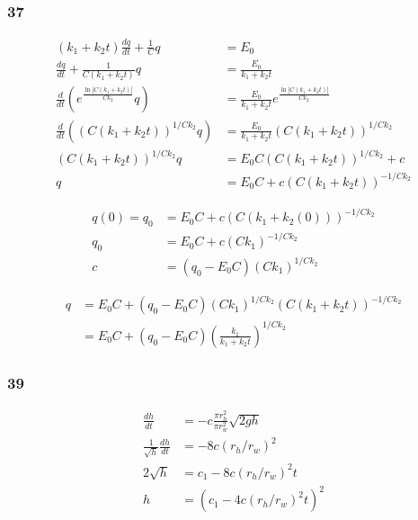 \documentclass{article}
\begin{document}
\subsubsection{37}

\begin{align*}
  (k_1 + k_2 t) \frac{dq}{dt} + \frac{1}{C} q              & = E_0                                                             \\
  \frac{dq}{dt} + \frac{1}{C (k_1 + k_2 t)} q              & = \frac{E_0}{k_1 + k_2 t}                                         \\
  \frac{d}{dt} (e^{\frac{\ln |C (k_1 + k_2 t)|}{C k_2}} q) & = \frac{E_0}{k_1 + k_2 t} e^{\frac{\ln |C (k_1 + k_2 t)|}{C k_2}} \\
  \frac{d}{dt} ((C (k_1 + k_2 t))^{1 / C k_2} q)           & = \frac{E_0}{k_1 + k_2 t} (C (k_1 + k_2 t))^{1 / C k_2}           \\
  (C (k_1 + k_2 t))^{1 / C k_2} q                          & = E_0 C (C (k_1 + k_2 t))^{1 / C k_2} + c                         \\
  q                                                        & = E_0 C + c (C (k_1 + k_2 t))^{-1 / C k_2}
\end{align*}

\begin{align*}
  q(0) = q_0 & = E_0 C + c (C (k_1 + k_2 (0)))^{-1 / C k_2} \\
  q_0        & = E_0 C + c (C k_1)^{-1 / C k_2}             \\
  c          & = (q_0 - E_0 C) (C k_1)^{1 / C k_2}
\end{align*}

\begin{align*}
  q & = E_0 C + (q_0 - E_0 C) (C k_1)^{1 / C k_2} (C (k_1 + k_2 t))^{-1 / C k_2} \\
    & = E_0 C + (q_0 - E_0 C) \left( \frac{k_1}{k_1 + k_2 t} \right)^{1 / C k_2}
\end{align*}

\subsubsection{39}

\begin{align*}
  \frac{dh}{dt}                    & = -c \frac{\pi r_h^2}{\pi r_w^2} \sqrt{2 g h} \\
  \frac{1}{\sqrt{h}} \frac{dh}{dt} & = -8 c (r_h / r_w)^2                          \\
  2 \sqrt{h}                       & = c_1 - 8 c (r_h / r_w)^2 t                   \\
  h                                & = (c_1 - 4 c (r_h / r_w)^2 t)^2
\end{align*}
\end{document}
